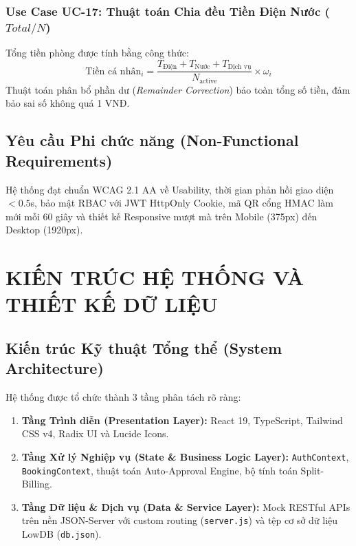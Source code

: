 \documentclass[12pt,a4paper,oneside]{report}
\begin{document}
\subsection{Use Case UC-17: Thuật toán Chia đều Tiền Điện Nước ($Total / N$)}
Tổng tiền phòng được tính bằng công thức:
\begin{equation}
    \text{Tiền cá nhân}_i = \frac{T_{\text{Điện}} + T_{\text{Nước}} + T_{\text{Dịch vụ}}}{N_{\text{active}}} \times \omega_i
\end{equation}
Thuật toán phân bổ phần dư (\textit{Remainder Correction}) bảo toàn tổng số tiền, đảm bảo sai số không quá 1 VNĐ.

\section{Yêu cầu Phi chức năng (Non-Functional Requirements)}
Hệ thống đạt chuẩn WCAG 2.1 AA về Usability, thời gian phản hồi giao diện $< 0.5$s, bảo mật RBAC với JWT HttpOnly Cookie, mã QR cổng HMAC làm mới mỗi 60 giây và thiết kế Responsive mượt mà trên Mobile (375px) đến Desktop (1920px).

\chapter{KIẾN TRÚC HỆ THỐNG VÀ THIẾT KẾ DỮ LIỆU}
\label{ch:architecture}

\section{Kiến trúc Kỹ thuật Tổng thể (System Architecture)}
Hệ thống được tổ chức thành 3 tầng phân tách rõ ràng:
\begin{enumerate}
    \item \textbf{Tầng Trình diễn (Presentation Layer):} React 19, TypeScript, Tailwind CSS v4, Radix UI và Lucide Icons.
    \item \textbf{Tầng Xử lý Nghiệp vụ (State \& Business Logic Layer):} \texttt{AuthContext}, \texttt{BookingContext}, thuật toán Auto-Approval Engine, bộ tính toán Split-Billing.
    \item \textbf{Tầng Dữ liệu \& Dịch vụ (Data \& Service Layer):} Mock RESTful APIs trên nền JSON-Server với custom routing (\texttt{server.js}) và tệp cơ sở dữ liệu LowDB (\texttt{db.json}).
\end{enumerate}
\end{document}
